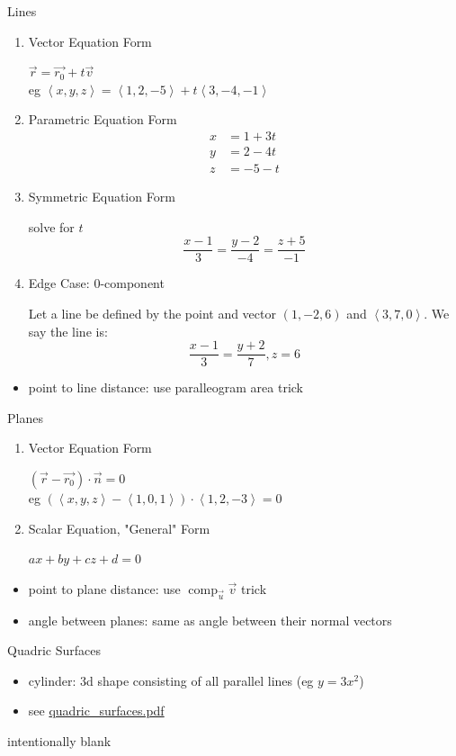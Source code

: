 \documentclass[11pt]{article}
\theoremstyle{definition}
\newcommand{\col}[1]{\begin{minipage}{\columnwidth}#1\end{minipage}}
\DeclareMathOperator{\comp}{comp}
\begin{document}
\newpage
\begin{multicols}{2}
  \col{
    Lines
    \begin{enumerate}[(1)]
      \item Vector Equation Form
      
      $\vec{r} = \vec{r_0} + t\vec{v}$ \\
      eg $\left<x,y,z\right> = \left<1,2,-5\right> + t\left<3,-4,-1\right>$
      \item Parametric Equation Form
      \begin{align*}
        x &= 1+3t \\
        y &= 2-4t \\
        z &= -5-t 
      \end{align*}
      
      \item Symmetric Equation Form 
      
      solve for $t$
      \[\frac{x-1}{3} = \frac{y-2}{-4} = \frac{z+5}{-1}\]

      \item Edge Case: 0-component
      
      Let a line be defined by the point and vector $(1,-2,6)$ and $\left<3,7,0\right>$. We say the line is:
      \[ \frac{x-1}{3} = \frac{y+2}{7}, z=6 \]
    \end{enumerate}
    \begin{itemize}
      \item point to line distance: use paralleogram area trick
    \end{itemize}

    Planes
    \begin{enumerate}[(1)]
      \item Vector Equation Form
      
      $(\vec{r}-\vec{r_0})\cdot \vec{n} = 0$ \\
      eg $(\left<x,y,z\right>-\left<1,0,1\right>) \cdot \left<1,2,-3\right> = 0$
      \item Scalar Equation, "General" Form
      
      $ax +by +cz +d = 0$
    \end{enumerate}
    \begin{itemize}
      \item point to plane distance: use $\comp_{\vec{u}}\vec{v}$ trick
      \item angle between planes: same as angle between their normal vectors
    \end{itemize}

    Quadric Surfaces
    \begin{itemize}
      \item cylinder: 3d shape consisting of all parallel lines (eg $y=3x^2$)
      \item see \url{quadric_surfaces.pdf}
    \end{itemize}
  }
  \col{
    intentionally blank
  }
\end{multicols}
\end{document}
